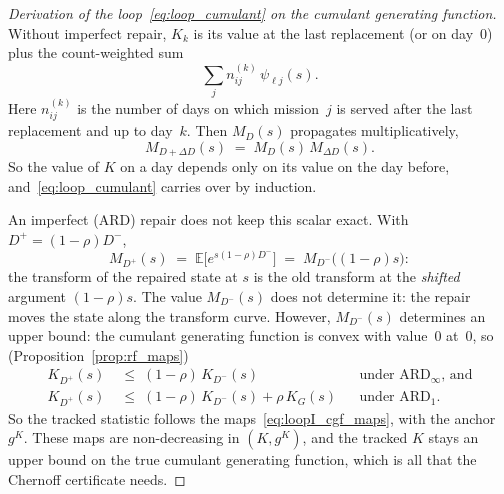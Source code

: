 \documentclass[11pt,a4paper]{article}
\theoremstyle{plain}
\theoremstyle{definition}
\theoremstyle{remark}
\begin{document}
\label{drv:loopI_cumulant}
\begin{proof}[Derivation of the loop~\eqref{eq:loop_cumulant} on the cumulant generating function]
Without imperfect repair, $K_k$ is its value at the last replacement (or on day~$0$) plus the count-weighted sum
\begin{equation}
  \sum_j n^{(k)}_{ij}\,\psi_{\ell j}(s).
\end{equation}
Here $n^{(k)}_{ij}$ is the number of days on which mission~$j$ is served after the last replacement and up to day~$k$.
Then $M_{D}(s)$ propagates multiplicatively,
\begin{equation}
  M_{D + \Delta D}(s) \;=\; M_D(s)\,M_{\Delta D}(s).
\end{equation}
So the value of $K$ on a day depends only on its value on the day before, and~\eqref{eq:loop_cumulant} carries over by induction.

An imperfect (ARD) repair does not keep this scalar exact. With $D^+ = (1-\rho)D^-$,
\begin{equation}\label{eq:mgf_rescale}
  M_{D^+}(s) \;=\; \mathbb{E}\big[e^{s(1-\rho)D^-}\big] \;=\; M_{D^-}\big((1-\rho)s\big):
\end{equation}
the transform of the repaired state at $s$ is the old transform at the \emph{shifted} argument $(1-\rho)s$.
The value $M_{D^-}(s)$ does not determine it: the repair moves the state along the transform curve.
However, $M_{D^-}(s)$ determines an upper bound: the cumulant generating function is convex with value~$0$ at~$0$, so (Proposition~\ref{prop:rf_maps})
\begin{align}
  K_{D^+}(s) &\;\le\; (1-\rho)\,K_{D^-}(s) && \text{under $\text{ARD}_\infty$, and}\\
  K_{D^+}(s) &\;\le\; (1-\rho)\,K_{D^-}(s) + \rho\,K_G(s) && \text{under $\text{ARD}_1$.}
\end{align}
So the tracked statistic follows the maps~\eqref{eq:loopI_cgf_maps}, with the anchor~$g^K$.
These maps are non-decreasing in $(K, g^K)$, and the tracked $K$ stays an upper bound on the true cumulant generating function, which is all that the Chernoff certificate needs.
\end{proof}
\end{document}

